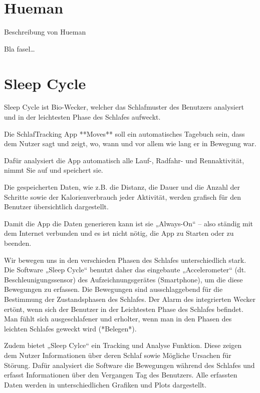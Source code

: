 \section{Hueman}
\label{ch:Apps:sec:Hueman}

Beschreibung von Hueman

Bla fasel\ldots

\section{Sleep Cycle}
\label{ch:Apps:sec:SleepCycle}

Sleep Cycle ist Bio-Wecker, welcher das Schlafmuster des Benutzers analysiert und in der leichtesten Phase des Schlafes aufweckt.


Die SchlafTracking App **Moves** soll ein automatisches Tagebuch sein, dass dem Nutzer sagt und zeigt, wo, wann und vor allem wie lang er in Bewegung war.

Dafür analysiert die App automatisch alle Lauf-, Radfahr- und Rennaktivität, nimmt Sie auf und speichert sie. 

Die gespeicherten Daten, wie z.B. die Distanz, die Dauer und die Anzahl der Schritte  sowie der Kalorienverbrauch jeder Aktivität, werden grafisch für den Benutzer übersichtlich dargestellt. 

Damit die App die Daten generieren kann ist sie „Always-On“ – also ständig mit dem Internet verbunden und es ist nicht nötig, die App zu Starten oder zu beenden.




Wir bewegen uns in den verschieden Phasen des Schlafes unterschiedlich stark. Die Software „Sleep Cycle“ benutzt daher das eingebaute „Accelerometer“ (dt. Beschleunigungssensor) des Aufzeichnungsgerätes (Smartphone), um die diese Bewegungen zu erfassen. Die Bewegungen sind ausschlaggebend für die Bestimmung der Zustandsphasen des Schlafes.
Der Alarm des integrierten Wecker ertönt, wenn sich der Benutzer in der Leichtesten Phase des Schlafes befindet.
Man fühlt sich ausgeschlafener und erholter, wenn man in den Phasen des leichten Schlafes geweckt wird (*Belegen*). 

Zudem bietet „Sleep Cylce“ ein Tracking und Analyse Funktion.
Diese zeigen dem Nutzer Informationen über deren Schlaf sowie Mögliche Ursachen für Störung.
Dafür analysiert die Software die Bewegungen während des Schlafes und erfasst Informationen über den Vergangen Tag des Benutzers.
Alle erfassten Daten werden in unterschiedlichen Grafiken und Plots dargestellt.

